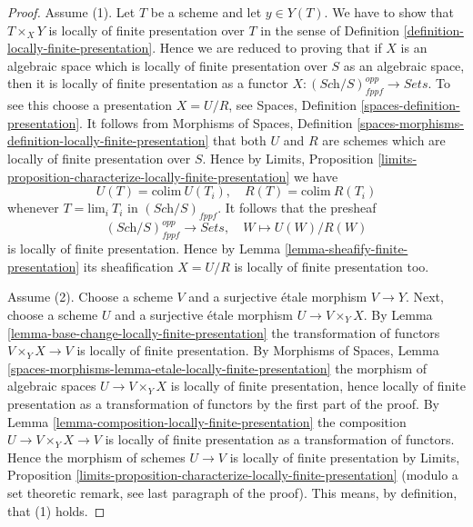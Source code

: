 \begin{proof}
Assume (1). Let $T$ be a scheme and let $y \in Y(T)$. We have to show that
$T \times_X Y$ is locally of finite presentation over $T$ in the sense of
Definition \ref{definition-locally-finite-presentation}.
Hence we are reduced to proving that if $X$ is an algebraic space which
is locally of finite presentation over $S$ as an algebraic space, then it
is locally of finite presentation as a functor
$X : (\textit{Sch}/S)_{fppf}^{opp} \to \textit{Sets}$.
To see this choose a presentation $X = U/R$, see
Spaces, Definition \ref{spaces-definition-presentation}.
It follows from
Morphisms of Spaces,
Definition \ref{spaces-morphisms-definition-locally-finite-presentation}
that both $U$ and $R$ are schemes which are locally of finite presentation
over $S$. Hence by
Limits, Proposition
\ref{limits-proposition-characterize-locally-finite-presentation}
we have
$$
U(T) = \text{colim}\ U(T_i),\quad
R(T) = \text{colim}\ R(T_i)
$$
whenever $T = \text{lim}_i\ T_i$ in $(\textit{Sch}/S)_{fppf}$. It follows
that the presheaf
$$
(\textit{Sch}/S)_{fppf}^{opp} \longrightarrow \textit{Sets},\quad
W \longmapsto U(W)/R(W)
$$
is locally of finite presentation. Hence by
Lemma \ref{lemma-sheafify-finite-presentation}
its sheafification $X = U/R$ is locally of finite presentation too.

\medskip\noindent
Assume (2). Choose a scheme $V$ and a surjective \'etale morphism
$V \to Y$. Next, choose a scheme $U$ and a surjective \'etale morphism
$U \to V \times_Y X$. By
Lemma \ref{lemma-base-change-locally-finite-presentation}
the transformation of functors $V \times_Y X \to V$ is locally of
finite presentation. By
Morphisms of Spaces,
Lemma \ref{spaces-morphisms-lemma-etale-locally-finite-presentation}
the morphism of algebraic spaces $U \to V \times_Y X$ is locally
of finite presentation, hence locally of finite presentation as
a transformation of functors by the first part of the proof. By
Lemma \ref{lemma-composition-locally-finite-presentation}
the composition $U \to V \times_Y X \to V$ is locally of
finite presentation as a transformation of functors. Hence
the morphism of schemes $U \to V$ is locally of finite presentation by
Limits, Proposition
\ref{limits-proposition-characterize-locally-finite-presentation}
(modulo a set theoretic remark, see last paragraph of the proof).
This means, by definition, that (1) holds.


\end{proof}
